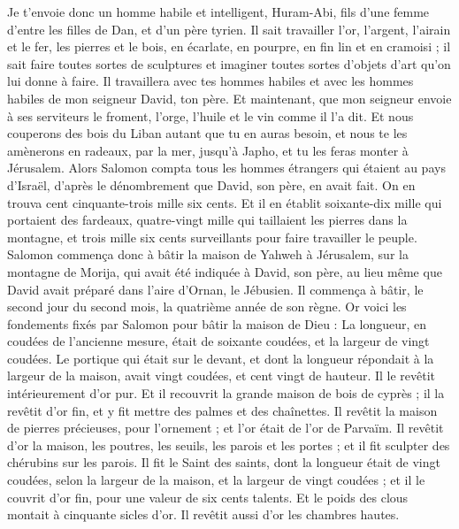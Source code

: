 \begin{multicols}{2}
Je t'envoie donc un homme habile et intelligent, Huram-Abi,
fils d'une femme d'entre les filles de Dan, et d'un père tyrien. Il sait travailler l'or, l'argent, l'airain et le fer, les pierres et le bois, en écarlate, en pourpre, en fin lin et en cramoisi ; il sait faire toutes sortes de sculptures et imaginer toutes sortes d'objets d'art qu'on lui donne à faire. Il travaillera avec tes hommes habiles et avec les hommes habiles de mon seigneur David, ton père.
Et maintenant, que mon seigneur envoie à ses serviteurs le froment, l'orge, l'huile et le vin comme il l'a dit.
Et nous couperons des bois du Liban autant que tu en auras besoin, et nous te les amènerons en radeaux, par la mer, jusqu'à Japho, et tu les feras monter à Jérusalem.
Alors Salomon compta tous les hommes étrangers qui étaient au pays d'Israël, d’après le dénombrement que David, son père, en avait fait. On en trouva cent cinquante-trois mille six cents.
Et il en établit soixante-dix mille qui portaient des fardeaux, quatre-vingt mille qui taillaient les pierres dans la montagne, et trois mille six cents surveillants pour faire travailler le peuple.
\VerseOne{}Salomon commença donc à bâtir la maison de Yahweh à Jérusalem, sur la montagne de Morija, qui avait été indiquée à David, son père, au lieu même que David avait préparé dans l'aire d'Ornan, le Jébusien.
Il commença à bâtir, le second jour du second mois, la quatrième année de son règne.
Or voici les fondements fixés par Salomon pour bâtir la maison de Dieu : La longueur, en coudées de l'ancienne mesure, était de soixante coudées, et la largeur de vingt coudées.
Le portique qui était sur le devant, et dont la longueur répondait à la largeur de la maison, avait vingt coudées, et cent vingt de hauteur. Il le revêtit intérieurement d'or pur.
Et il recouvrit la grande maison de bois de cyprès ; il la revêtit d'or fin, et y fit mettre des palmes et des chaînettes.
Il revêtit la maison de pierres précieuses, pour l'ornement ; et l'or était de l'or de Parvaïm.
Il revêtit d'or la maison, les poutres, les seuils, les parois et les portes ; et il fit sculpter des chérubins sur les parois.
Il fit le Saint des saints, dont la longueur était de vingt coudées, selon la largeur de la maison, et la largeur de vingt coudées ; et il le couvrit d'or fin, pour une valeur de six cents talents.
Et le poids des clous montait à cinquante sicles d'or. Il revêtit aussi d'or les chambres hautes.

\end{multicols}
